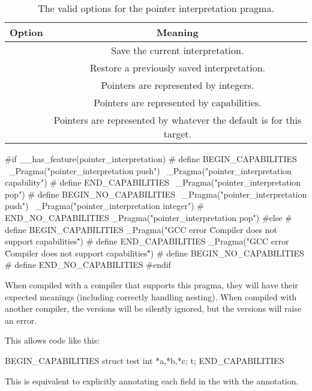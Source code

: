 \begin{table}
	\begin{center}
		\begin{tabu}{*{2}{c}}
			\toprule
			\headerrow
			Option & Meaning\\
			\midrule
			 & Save the current interpretation. \\
			 & Restore a previously saved interpretation. \\
			 & Pointers are represented by integers. \\
			 & Pointers are represented by capabilities. \\
			 & Pointers are represented by whatever the default is for this target. \\
			\bottomrule
		\end{tabu}
		\caption{\label{tbl:pointerinterpretation}The valid options for the pointer interpretation pragma.}
	\end{center}
\end{table}

\begin{csnippet}
#if __has_feature(pointer_interpretation)
#	define BEGIN_CAPABILITIES \
		_Pragma("pointer_interpretation push") \
		_Pragma("pointer_interpretation capability")
#	define END_CAPABILITIES \
		_Pragma("pointer_interpretation pop")
#	define BEGIN_NO_CAPABILITIES \
		_Pragma("pointer_interpretation push") \
		_Pragma("pointer_interpretation integer")
#	 END_NO_CAPABILITIES
		_Pragma("pointer_interpretation pop")
#else
#	define BEGIN_CAPABILITIES
		_Pragma("GCC error \"Compiler does not support capabilities\"")
#	define END_CAPABILITIES
		_Pragma("GCC error \"Compiler does not support capabilities\"")
#	define BEGIN_NO_CAPABILITIES
#	define END_NO_CAPABILITIES
#endif
\end{csnippet}

When compiled with a compiler that supports this pragma, they will have their expected meanings (including correctly handling nesting).
When compiled with another compiler, the  versions will be silently ignored, but the  versions will raise an error.

This allows code like this:

\begin{csnippet}
BEGIN_CAPABILITIES
struct test
{
	int *a,*b,*c;
} t;
END_CAPABILITIES
\end{csnippet}

This is equivalent to explicitly annotating each field in the  with the  annotation.


